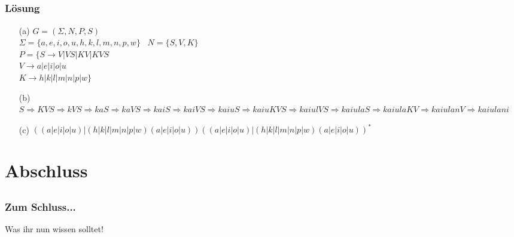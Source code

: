 \subsection*{}
\begin{frame}
	\frametitle{Lösung}
	\begin{enumerate}
		\item[(a)] $G = (\Sigma, N, P, S)$ \\
		$\Sigma=\{a,e,i,o,u,h,k,l,m,n,p,w\}$ \ $N=\{S,V,K \}$ \\
		$P=\{ S \rightarrow V|VS|KV|KVS $ \\
				$ V \rightarrow a|e|i|o|u$ \\
				$ K \rightarrow h|k|l|m|n|p|w \}$
		\pause
		\item[(b)] $S \Rightarrow KVS \Rightarrow kVS \Rightarrow kaS \Rightarrow kaVS \Rightarrow kaiS \Rightarrow kaiVS \Rightarrow kaiuS \Rightarrow kaiuKVS \Rightarrow kaiulVS \Rightarrow kaiulaS \Rightarrow kaiulaKV \Rightarrow kaiulanV \Rightarrow kaiulani$
		\pause
		\item[(c)] $((a|e|i|o|u)|(h|k|l|m|n|p|w)(a|e|i|o|u))
((a|e|i|o|u)|(h|k|l|m|n|p|w)(a|e|i|o|u))^*$
	\end{enumerate}
\end{frame}



\section{Abschluss}
\subsection*{}
\begin{frame}
	\frametitle{Zum Schluss...}
	\begin{block}{Was ihr nun wissen solltet!}
	\begin{itemize}
    \end{itemize}
   	\end{block}

\end{frame}